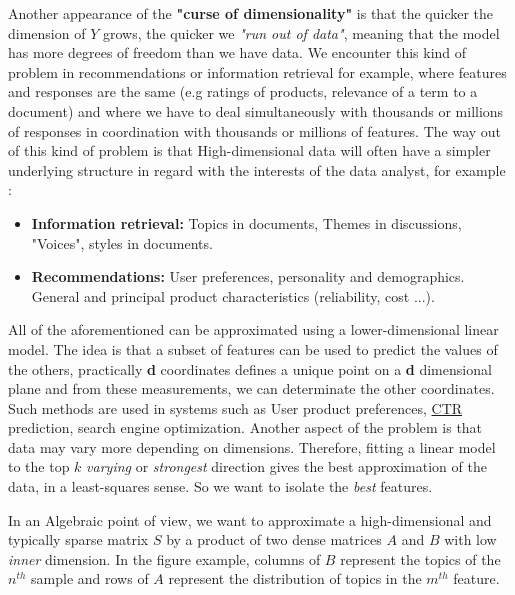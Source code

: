 Another appearance of the \textbf{"curse of dimensionality"} is that the quicker the dimension of $Y$ grows, the quicker we \emph{"run out of data"}, meaning that the model has more degrees of freedom than we have data. We encounter this kind of problem in recommendations or information retrieval for example, where features and responses are the same (e.g ratings of products, relevance of a term to a document) and where we have to deal simultaneously with thousands or millions of responses in coordination with thousands or millions of features.
The way out of this kind of problem is that High-dimensional data will often have a simpler underlying structure in regard with the interests of the data analyst, for example :
\begin{itemize}
\item \textbf{Information retrieval:} Topics in documents, Themes in discussions, "Voices", styles in documents.
\item \textbf{Recommendations:} User preferences, personality and demographics. General and principal product characteristics (reliability, cost ...).
\end{itemize}
All of the aforementioned can be approximated using a lower-dimensional linear model. The idea is that a subset of features can be used to predict the values of the others, practically \textbf{d} coordinates defines a unique point on a \textbf{d} dimensional plane and from these measurements, we can determinate the other coordinates. Such methods are used in systems such as User product preferences, \href{https://en.wikipedia.org/wiki/Click-through_rate}{CTR} prediction, search engine optimization.
Another aspect of the problem is that data may vary more depending on dimensions. Therefore, fitting a linear model to the top $k$ \emph{varying} or \emph{strongest} direction gives the best approximation of the data, in a least-squares sense. So we want to isolate the \emph{best} features.



In an Algebraic point of view, we want to approximate a high-dimensional and typically sparse matrix $S$ by a product of two dense matrices $A$ and $B$ with low \emph{inner} dimension. In the figure example, columns of $B$ represent the topics of the $n^{th}$ sample and rows of $A$ represent the distribution of topics in the $m^{th}$ feature.



